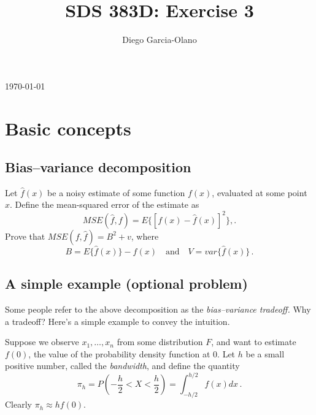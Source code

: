 \documentclass{homework}
\title{SDS 383D: Exercise 3}
\author{Diego Garcia-Olano}
\newcommand{\1}{\mathbf{1}}
\begin{document}
\makeatletter
\begin{titlepage}
	\vspace*{\fill}
	\centering
	{\huge \@title \par}
	\vskip0.5cm
	{\large \@author \par}
	\vskip0.5cm
	{\large \today \par}
	\vspace*{\fill}
\end{titlepage}
\makeatother

\newpage 
\mbox{}
\thispagestyle{empty}

\setcounter{page}{1}


\section{Basic concepts}

\subsection{Bias--variance decomposition}

Let $\hat{f}(x)$ be a noisy estimate of some function $f(x)$, evaluated at some point $x$.  Define the mean-squared error of the estimate as
$$
MSE(\hat{f}, f) = E\{ [ f(x) - \hat{f}(x)]^2 \} , .
$$
Prove that $MSE(f, \hat{f}) = B^2 + v$, where
$$
B = E \{ \hat{f}(x) \} - f(x) \quad \mbox{and} \quad V = var\{ \hat{f}(x) \} \, .
$$

\subsection{A simple example  (optional problem)}

Some people refer to the above decomposition as the \textit{bias--variance tradeoff.}  Why a tradeoff?  Here's a simple example to convey the intuition.

Suppose we observe $x_1, \ldots, x_n$ from some distribution $F$, and want to estimate $f(0)$, the value of the probability density function at 0.  Let $h$ be a small positive number, called the \textit{bandwidth}, and define the quantity
$$
\pi_h = P\left( -\frac{h}{2} < X < \frac{h}{2} \right) = \int_{-h/2}^{h/2} f(x) dx \, .
$$
Clearly $\pi_h \approx h f(0)$.
\end{document}
